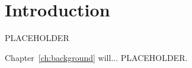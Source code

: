 \chapter{Introduction}\label{ch:intro}

PLACEHOLDER

Chapter~\ref{ch:background} will... PLACEHOLDER.

